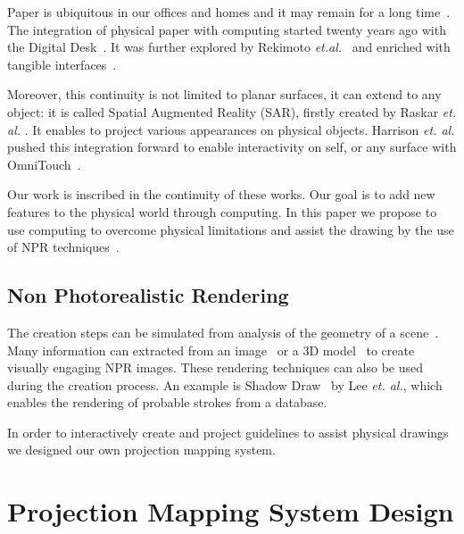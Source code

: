 \documentclass{sigchi}
\begin{document}
Paper is ubiquitous in our offices and homes and it may remain
for a long time~\cite{sellen2003myth}. 
The integration of physical paper with computing started
twenty years ago with the Digital Desk~\cite{wellner1993interacting}. 
It was further explored by Rekimoto
\textit{et.al.}~\cite{rekimoto1999augmented} and enriched with
tangible interfaces~\cite{ullmer2000emerging}. 

Moreover, this continuity is not limited to planar surfaces,
it can extend to any object: it is called Spatial Augmented Reality (SAR),
firstly created by Raskar \textit{et. al.}
\cite{raskar2001shader}. It enables to project
various
appearances on physical objects. Harrison \textit{et. al.} pushed this
integration forward to enable interactivity on self, or any surface with
OmniTouch~\cite{harrison2011omnitouch}. 

Our work is inscribed in the continuity of these works. Our goal is
to add new features to the physical world through computing. In this
paper we propose to use computing to overcome physical limitations and
assist the drawing by the use of NPR techniques~\cite{gooch2001non}. 

 
\subsection{Non Photorealistic Rendering}

The creation steps can be simulated
from analysis of the geometry of a scene~\cite{grabli2010programmable}. 
Many information can extracted from an image~\cite{haeberli1990paint}
or a 3D model~\cite{VBGS08} to create visually engaging NPR images. 
These rendering techniques can also be used during the creation
process. An example is Shadow Draw~\cite{leeshadowdraw} by Lee
\textit{et. al.}, which enables the rendering of probable strokes from
a database. 

In order to interactively create and project guidelines to assist
physical drawings we designed our own projection mapping system. 


\section{Projection Mapping System Design}
\end{document}
